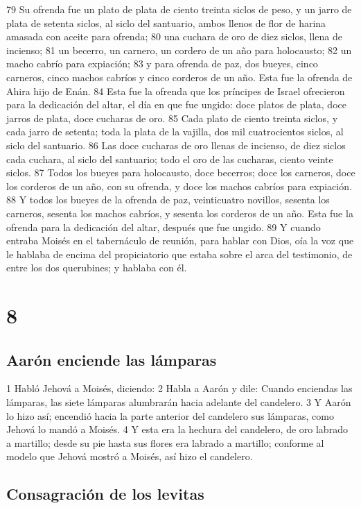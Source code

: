 79 Su ofrenda fue un plato de plata de ciento treinta siclos de peso,  y un jarro de plata de setenta siclos, al siclo del santuario, ambos llenos de flor de harina amasada con aceite para ofrenda;
80 una cuchara de oro de diez siclos,  llena de incienso;
81 un becerro, un carnero, un cordero de un año para holocausto;
82 un macho cabrío para expiación;
83 y para ofrenda de paz, dos bueyes, cinco carneros, cinco machos cabríos y cinco corderos de un año. Esta fue la ofrenda de Ahira hijo de Enán.
84 Esta fue la ofrenda que los príncipes de Israel ofrecieron para la dedicación del altar, el día en que fue ungido: doce platos de plata, doce jarros de plata, doce cucharas de oro.
85 Cada plato de ciento treinta siclos,  y cada jarro de setenta; toda la plata de la vajilla, dos mil cuatrocientos siclos, al siclo del santuario.
86 Las doce cucharas de oro llenas de incienso, de diez siclos   cada cuchara, al siclo del santuario; todo el oro de las cucharas, ciento veinte siclos.
87 Todos los bueyes para holocausto, doce becerros; doce los carneros, doce los corderos de un año, con su ofrenda, y doce los machos cabríos para expiación.
88 Y todos los bueyes de la ofrenda de paz, veinticuatro novillos, sesenta los carneros, sesenta los machos cabríos, y sesenta los corderos de un año. Esta fue la ofrenda para la dedicación del altar, después que fue ungido.
89 Y cuando entraba Moisés en el tabernáculo de reunión, para hablar con Dios, oía la voz que le hablaba de encima del propiciatorio que estaba sobre el arca del testimonio, de entre los dos querubines; y hablaba con él.

\chapter{8}

\section*{Aarón enciende las lámparas}


1 Habló Jehová a Moisés, diciendo:
2 Habla a Aarón y dile: Cuando enciendas las lámparas, las siete lámparas alumbrarán hacia adelante del candelero.
3 Y Aarón lo hizo así; encendió hacia la parte anterior del candelero sus lámparas, como Jehová lo mandó a Moisés.
4 Y esta era la hechura del candelero, de oro labrado a martillo; desde su pie hasta sus flores era labrado a martillo; conforme al modelo que Jehová mostró a Moisés, así hizo el candelero.
\section*{Consagración de los levitas}

